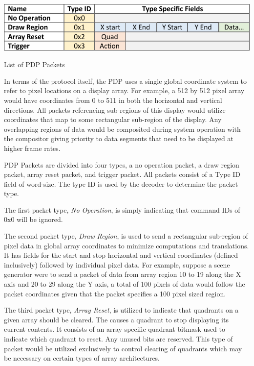     \begin{table}
        \centering
        \includegraphics[width=1.0\textwidth]{fig/packet_chart.pdf}
        \caption{List of PDP Packets}
        \label{tbl:packets}
    \end{table}

    In terms of the protocol itself, the PDP uses a single global coordinate system to refer to pixel locations on a display array. For example, a 512 by 512 pixel array would have coordinates from 0 to 511 in both the horizontal and vertical directions. All packets referencing sub-regions of this display would utilize coordinates that map to some rectangular sub-region of the display. Any overlapping regions of data would be composited during system operation with the compositor giving priority to data segments that need to be displayed at higher frame rates.

    PDP Packets are divided into four types, a no operation packet, a draw region packet, array reset packet, and trigger packet. All packets consist of a Type ID field of word-size. The type ID is used by the decoder to determine the packet type.

    The first packet type, {\it No Operation}, is simply indicating that command IDs of 0x0 will be ignored.

    The second packet type, {\it Draw Region}, is used to send a rectangular sub-region of pixel data in global array coordinates to minimize computations and translations. It has fields for the start and stop horizontal and vertical coordinates (defined inclusively) followed by individual pixel data. For example, suppose a scene generator were to send a packet of data from array region 10 to 19 along the X axis and 20 to 29 along the Y axis, a total of 100 pixels of data would follow the packet coordinates given that the packet specifies a 100 pixel sized region.

    The third packet type, {\it Array Reset}, is utilized to indicate that quadrants on a given array should be cleared. The causes a quadrant to stop displaying its current contents. It consists of an array specific quadrant bitmask used to indicate which quadrant to reset. Any unused bits are reserved. This type of packet would be utilized exclusively to control clearing of quadrants which may be necessary on certain types of array architectures.

